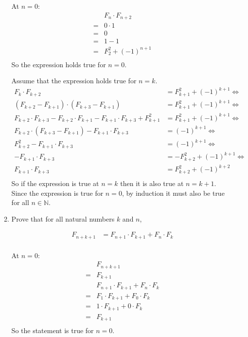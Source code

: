 \documentclass[10pt,\jkfside,a4paper]{article}
\begin{document}
\begin{enumerate}
\begin{enumerate}
At $n = 0$:
\begin{equation}
\begin{split}
 & F_n \cdot F_{n + 2}\\
=& 0 \cdot 1\\
=& 0\\
=& 1 - 1\\
=& F_2^2 + (-1)^{n + 1}\\
\end{split}
\end{equation}
So the expression holds true for $n = 0$.

Assume that the expression holds true for $n = k$.
\begin{equation}
\begin{split}
F_k \cdot F_{k + 2} &= F_{k + 1}^2 + (-1)^{k + 1}\Longleftrightarrow\\
(F_{k + 2} - F_{k + 1}) \cdot (F_{k + 3} - F_{k + 1}) &= F_{k + 1}^2 + (-1)^{k + 1}\Longleftrightarrow\\
F_{k+2}\cdot F_{k+3} - F_{k+2}\cdot F_{k+1} - F_{k + 1} \cdot F_{k + 3} + F_{k + 1}^2 &= F_{k + 1}^2 + (-1)^{k + 1}\Longleftrightarrow\\
F_{k + 2}\cdot (F_{k + 3} - F_{k + 1})- F_{k + 1} \cdot F_{k + 3} &= (-1)^{k + 1}\Longleftrightarrow\\
F_{k+2}^2 - F_{k + 1}\cdot F_{k + 3} &= (-1)^{k + 1}\Longleftrightarrow\\
- F_{k + 1}\cdot F_{k + 3} &= - F_{k + 2}^2 + (-1)^{k + 1}\Longleftrightarrow\\
F_{k + 1}\cdot F_{k + 3} &= F_{k + 2}^2 + (-1)^{k + 2}\\
\end{split}
\end{equation}
So if the expression is true at $n = k$ then it is also true at $n = k + 1$. Since the expression is 
true for $n = 0$, by induction it must also be true for all $n \in \mathbb{N}$.

\item Prove that for all natural numbers $k$ and $n$,

\begin{equation}\label{fnpluskplus1}
\begin{split}
F_{n + k + 1} &= F_{n + 1}\cdot F_{k + 1} + F_n \cdot F_k\\
\end{split}
\end{equation}

At $n = 0$:
\begin{equation}
\begin{split}
 & F_{n + k + 1}\\
=& F_{k + 1}\\
 & F_{n + 1} \cdot F_{k + 1} + F_n\cdot F_k\\
=& F_1 \cdot F_{k + 1} + F_0\cdot F_k\\
=& 1 \cdot F_{k + 1} + 0 \cdot F_k\\
=& F_{k + 1}\\
\end{split}
\end{equation}
So the statement is true for $n = 0$.


\end{enumerate}
\end{enumerate}
\end{document}
